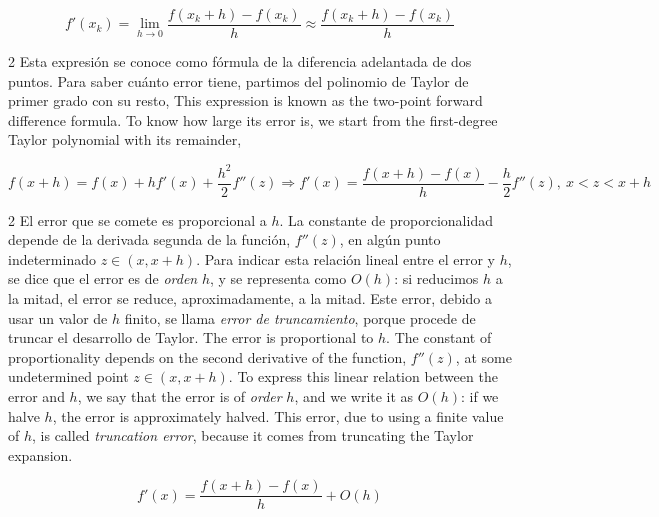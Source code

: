 \begin{equation*}
f'(x_k)=\lim_{h\rightarrow 0}\frac{f(x_k+h)-f(x_k)}{h} \approx \frac{f(x_k+h)-f(x_k)}{h}
\end{equation*}
\begin{paracol}{2}
Esta expresión se conoce como fórmula de la diferencia adelantada de dos puntos. Para saber cuánto error tiene, partimos del polinomio de Taylor de primer grado con su resto,
\switchcolumn
This expression is known as the two-point forward difference formula. To know how large its error is, we start from the first-degree Taylor polynomial with its remainder,
\end{paracol}
\begin{equation*}
f(x+h)=f(x)+hf'(x)+\frac{h^2}{2}f''(z) \Rightarrow f'(x)=\frac{f(x+h)-f(x)}{h}-\frac{h}{2}f''(z), \ x<z<x+h
\end{equation*}
\begin{paracol}{2}
El error que se comete es proporcional a $h$. La constante de proporcionalidad depende de la derivada segunda de la función, $f''(z)$, en algún punto indeterminado $z\in (x,x+h)$. Para indicar esta relación lineal entre el error y $h$, se dice que el error es de \emph{orden} $h$, y se representa como $O(h)$: si reducimos $h$ a la mitad, el error se reduce, aproximadamente, a la mitad. Este error, debido a usar un valor de $h$ finito, se llama \emph{error de truncamiento}, porque procede de truncar el desarrollo de Taylor.
\switchcolumn
The error is proportional to $h$. The constant of proportionality depends on the second derivative of the function, $f''(z)$, at some undetermined point $z \in (x, x+h)$. To express this linear relation between the error and $h$, we say that the error is of \emph{order} $h$, and we write it as $O(h)$: if we halve $h$, the error is approximately halved. This error, due to using a finite value of $h$, is called \emph{truncation error}, because it comes from truncating the Taylor expansion.
\end{paracol}
\begin{equation*}
f'(x)=\frac{f(x+h)-f(x)}{h}+O(h)
\end{equation*}

